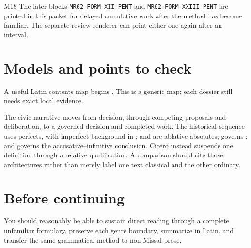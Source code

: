 \begin{courseunit}{M18}
The later blocks \texttt{MR62-FORM-XII-PENT} and
\texttt{MR62-FORM-XXIII-PENT} are printed in this packet for delayed cumulative
work after the method has become familiar.  The separate review renderer can
print either one again after an interval.

\ifsolutions
\section{Models and points to check}
A useful Latin contents map begins .  This is a generic
map; each dossier still needs exact local evidence.

The civic narrative moves from decision, through competing proposals and
deliberation, to a governed decision and completed work.  The historical
sequence uses perfects, with imperfect background in ;  and  are ablative
absolutes;  governs ; and  governs the accusative--infinitive
conclusion.  Cicero instead suspends one definition through a relative
qualification.  A comparison should cite those architectures rather than
merely label one text classical and the other ordinary.
\else
\section{Before continuing}
You should reasonably be able to sustain direct reading through a complete
unfamiliar formulary, preserve each genre boundary, summarize in Latin, and
transfer the same grammatical method to non-Missal prose.
\fi
\end{courseunit}

